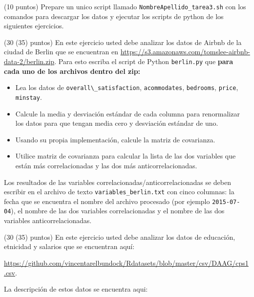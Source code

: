 \documentclass[11pt,letterpaper]{exam}
\begin{document}
\begin{questions}




(10 puntos) 
Prepare un unico script llamado \verb"NombreApellido_tarea3.sh" 
con los comandos para descargar los datos y ejecutar los scripts de python
de los siguientes ejercicios.


(30 (35) puntos) En este ejercicio usted debe analizar los datos de Airbnb
    de la ciudad de Berlin que se encuentran en
    \url{https://s3.amazonaws.com/tomslee-airbnb-data-2/berlin.zip}. 
    Para esto escriba el script de Python \verb"berlin.py" que
    {\bf para cada uno de los archivos dentro del zip:}\\
    \begin{itemize}
    \item {Lea los datos de \verb"overall\_satisfaction", \verb"acommodates",
        \verb"bedrooms", \verb"price", \verb"minstay".}
    \item{Calcule la media y desviaci\'on est\'andar de cada columna
      para renormalizar los datos para que tengan media cero y
      desviaci\'on est\'andar de uno.}
    \item{Usando su propia implementaci\'on, calcule la matriz de
      covarianza.}
    \item{Utilice matriz de covarianza para calcular la lista de las
      dos variables que est\'an m\'as correlacionadas y las dos m\'as
      anticorrelacionadas.}
    \end{itemize}
    Los resultados de las variables
    correlacionadas/anticorrelacionadas se deben escribir en el
    archivo de texto \verb"variables_berlin.txt" con cinco columnas: la
    fecha que se encuentra el nombre del archivo procesado (por
    ejemplo \verb"2015-07-04"), el nombre
    de las dos variables correlacionadas y el nombre de las dos
    variables anticorrelacionadas. 




(30 (35) puntos) En este ejercicio usted debe analizar los datos de
educaci\'on, etnicidad y salarios que se encuentran aqu\'i:

\url{https://github.com/vincentarelbundock/Rdatasets/blob/master/csv/DAAG/cps1.csv}.

La descripci\'on de estos datos se encuentra aqui:


\end{questions}
\end{document}
